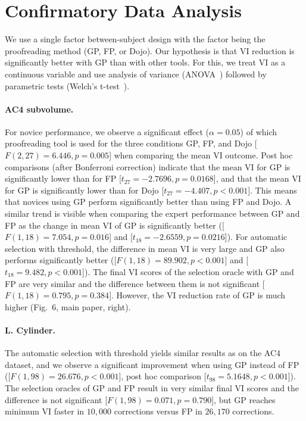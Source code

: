 \section{Confirmatory Data Analysis} 

We use a single factor between-subject design with the factor being the proofreading method (GP, FP, or Dojo). Our hypothesis is that VI reduction is significantly better with GP than with other tools. For this, we treat VI as a continuous variable and use analysis of variance (ANOVA~\cite{shaffer1995}) followed by parametric tests (Welch's t-test~\cite{welch}).

\paragraph{AC4 subvolume.} For novice performance, we observe a significant effect ($\alpha=0.05$) of which proofreading tool is used for the three conditions GP, FP, and Dojo [$F(2,27) = 6.446, p = 0.005$] when comparing the mean VI outcome. Post hoc comparisons (after Bonferroni correction) indicate that the mean VI for GP is significantly lower than for FP [$t_{27} = -2.7696, p = 0.0168$], and that the mean VI for GP is significantly lower than for Dojo [$t_{27} = -4.407, p < 0.001$]. This means that novices using GP perform significantly better than using FP and Dojo.
A similar trend is visible when comparing the expert performance between GP and FP as the change in mean VI of GP is significantly better ([$F(1,18) = 7.054, p = 0.016$] and [$t_{18} = -2.6559, p = 0.0216$]). For automatic selection with threshold, the difference in mean VI is very large and GP also performs significantly better ([$F(1,18) = 89.902, p < 0.001$] and [$t_{18} = 9.482, p < 0.001$]). The final VI scores of the selection oracle with GP and FP are very similar and the difference between them is not significant [$F(1,18) = 0.795, p = 0.384$]. However, the VI reduction rate of GP is much higher (Fig.~6, main paper, right).

\vspace{-4mm}

\paragraph{L. Cylinder.} The automatic selection with threshold yields similar results as on the AC4 dataset, and we observe a significant improvement when using GP instead of FP ([$F(1,98) = 26.676, p < 0.001$], post hoc comparison [$t_{98} = 5.1648, p < 0.001$]). The selection oracles of GP and FP result in very similar final VI scores and the difference is not significant [$F(1,98) = 0.071, p = 0.790$], but GP reaches minimum VI faster in $10,000$ corrections versus FP in $26,170$ corrections.
    
    